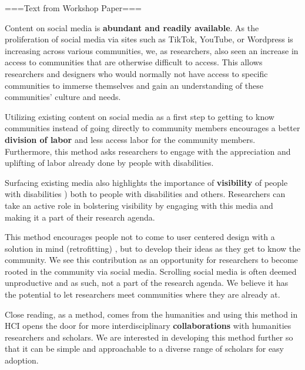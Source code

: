 ===Text from Workshop Paper===

Content on social media is \textbf{abundant and readily available}. As the proliferation of social media via sites such as TikTok, YouTube, or Wordpress is increasing across various communities, we, as researchers, also seen an increase in access to communities that are otherwise difficult to access. This allows researchers and designers who would normally not have access to specific communities to immerse themselves and gain an understanding of these communities' culture and needs.

Utilizing existing content on social media as a first step to getting to know communities instead of going directly to community members encourages a better \textbf{division of labor} and less access labor for the community members. Furthermore, this method asks researchers to engage with the appreciation and uplifting of labor already done by people with disabilities. 

Surfacing existing media also highlights the importance of \textbf{visibility} of people with disabilities \cite{wongDisabilityVisibilityTwentyfirst2020,profitaWearItLoud2018,faucettVisibilityDisabilityAssistive2017,duvalChasingPlayTikTok2021}) both to people with disabilities and others. Researchers can take an active role in bolstering visibility by engaging with this media and making it a part of their research agenda. 

This method encourages people not to come to user centered design with a solution in mind (retrofitting) \cite{mottAccessibleDesignOpportunity2019}, but to develop their ideas as they get to know the community. We see this contribution as an opportunity for researchers to become rooted in the community via social media. Scrolling social media is often deemed unproductive and as such, not a part of the research agenda. We believe it has the potential to let researchers meet communities where they are already at. 

Close reading, as a method, comes from the humanities and using this method in HCI opens the door for more interdisciplinary \textbf{collaborations} with humanities researchers and scholars. We are interested in developing this method further so that it can be simple and approachable to a diverse range of scholars for easy adoption. 
